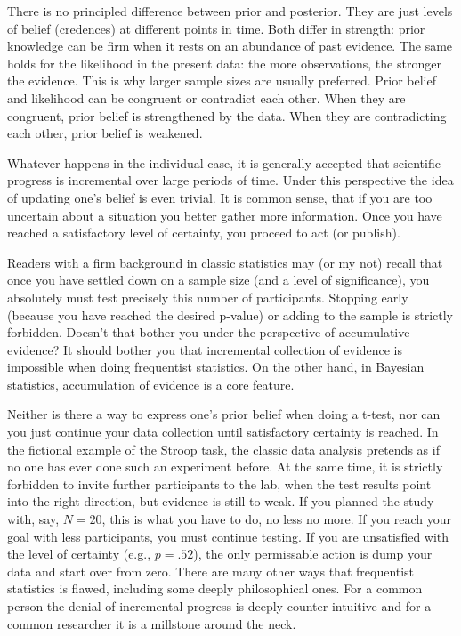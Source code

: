 \documentclass[]{svmono}
\theoremstyle{definition}
\theoremstyle{definition}
\theoremstyle{definition}
\theoremstyle{remark}
\begin{document}
There is no principled difference between prior and posterior. They are
just levels of belief (credences) at different points in time. Both
differ in strength: prior knowledge can be firm when it rests on an
abundance of past evidence. The same holds for the likelihood in the
present data: the more observations, the stronger the evidence. This is
why larger sample sizes are usually preferred. Prior belief and
likelihood can be congruent or contradict each other. When they are
congruent, prior belief is strengthened by the data. When they are
contradicting each other, prior belief is weakened.

Whatever happens in the individual case, it is generally accepted that
scientific progress is incremental over large periods of time. Under
this perspective the idea of updating one's belief is even trivial. It
is common sense, that if you are too uncertain about a situation you
better gather more information. Once you have reached a satisfactory
level of certainty, you proceed to act (or publish).

Readers with a firm background in classic statistics may (or my not)
recall that once you have settled down on a sample size (and a level of
significance), you absolutely must test precisely this number of
participants. Stopping early (because you have reached the desired
p-value) or adding to the sample is strictly forbidden. Doesn't that
bother you under the perspective of accumulative evidence? It should
bother you that incremental collection of evidence is impossible when
doing frequentist statistics. On the other hand, in Bayesian statistics,
accumulation of evidence is a core feature.

Neither is there a way to express one's prior belief when doing a
t-test, nor can you just continue your data collection until
satisfactory certainty is reached. In the fictional example of the
Stroop task, the classic data analysis pretends as if no one has ever
done such an experiment before. At the same time, it is strictly
forbidden to invite further participants to the lab, when the test
results point into the right direction, but evidence is still to weak.
If you planned the study with, say, \(N = 20\), this is what you have to
do, no less no more. If you reach your goal with less participants, you
must continue testing. If you are unsatisfied with the level of
certainty (e.g., \(p = .52\)), the only permissable action is dump your
data and start over from zero. There are many other ways that
frequentist statistics is flawed, including some deeply philosophical
ones. For a common person the denial of incremental progress is deeply
counter-intuitive and for a common researcher it is a millstone around
the neck.
\end{document}
